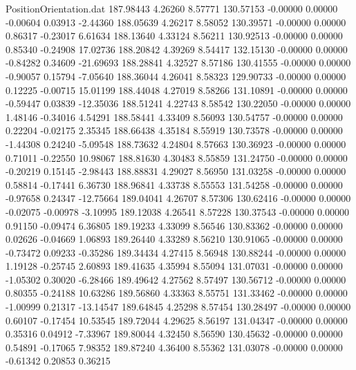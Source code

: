 \begin{filecontents}{PositionOrientation.dat}
 187.98443    4.26260    8.57771   130.57153   -0.00000    0.00000   -0.00604    0.03913   -2.44360
 188.05639    4.26217    8.58052   130.39571   -0.00000    0.00000    0.86317   -0.23017    6.61634
 188.13640    4.33124    8.56211   130.92513   -0.00000    0.00000    0.85340   -0.24908   17.02736
 188.20842    4.39269    8.54417   132.15130   -0.00000    0.00000   -0.84282    0.34609  -21.69693
 188.28841    4.32527    8.57186   130.41555   -0.00000    0.00000   -0.90057    0.15794   -7.05640
 188.36044    4.26041    8.58323   129.90733   -0.00000    0.00000    0.12225   -0.00715   15.01199
 188.44048    4.27019    8.58266   131.10891   -0.00000    0.00000   -0.59447    0.03839  -12.35036
 188.51241    4.22743    8.58542   130.22050   -0.00000    0.00000    1.48146   -0.34016    4.54291
 188.58441    4.33409    8.56093   130.54757   -0.00000    0.00000    0.22204   -0.02175    2.35345
 188.66438    4.35184    8.55919   130.73578   -0.00000    0.00000   -1.44308    0.24240   -5.09548
 188.73632    4.24804    8.57663   130.36923   -0.00000    0.00000    0.71011   -0.22550   10.98067
 188.81630    4.30483    8.55859   131.24750   -0.00000    0.00000   -0.20219    0.15145   -2.98443
 188.88831    4.29027    8.56950   131.03258   -0.00000    0.00000    0.58814   -0.17441    6.36730
 188.96841    4.33738    8.55553   131.54258   -0.00000    0.00000   -0.97658    0.24347  -12.75664
 189.04041    4.26707    8.57306   130.62416   -0.00000    0.00000   -0.02075   -0.00978   -3.10995
 189.12038    4.26541    8.57228   130.37543   -0.00000    0.00000    0.91150   -0.09474    6.36805
 189.19233    4.33099    8.56546   130.83362   -0.00000    0.00000    0.02626   -0.04669    1.06893
 189.26440    4.33289    8.56210   130.91065   -0.00000    0.00000   -0.73472    0.09233   -0.35286
 189.34434    4.27415    8.56948   130.88244   -0.00000    0.00000    1.19128   -0.25745    2.60893
 189.41635    4.35994    8.55094   131.07031   -0.00000    0.00000   -1.05302    0.30020   -6.28466
 189.49642    4.27562    8.57497   130.56712   -0.00000    0.00000    0.80355   -0.24188   10.63286
 189.56860    4.33363    8.55751   131.33462   -0.00000    0.00000   -1.00999    0.21317  -13.14547
 189.64845    4.25298    8.57454   130.28497   -0.00000    0.00000    0.60107   -0.17454   10.53545
 189.72044    4.29625    8.56197   131.04347   -0.00000    0.00000    0.35316    0.04912   -7.33967
 189.80044    4.32450    8.56590   130.45632   -0.00000    0.00000    0.54891   -0.17065    7.98352
 189.87240    4.36400    8.55362   131.03078   -0.00000    0.00000   -0.61342    0.20853    0.36215

\end{filecontents}
